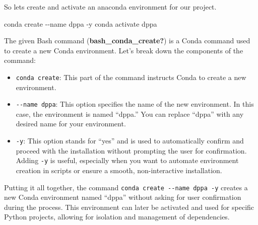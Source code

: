 \documentclass[
  letterpaper,
  DIV=11,
  numbers=noendperiod]{scrreprt}
\newenvironment{Shaded}{\begin{snugshade}}{\end{snugshade}}
\newcommand{\AttributeTok}[1]{\textcolor[rgb]{0.40,0.45,0.13}{#1}}
\newcommand{\ExtensionTok}[1]{\textcolor[rgb]{0.00,0.23,0.31}{#1}}
\newcommand{\NormalTok}[1]{\textcolor[rgb]{0.00,0.23,0.31}{#1}}
\begin{document}
So lets create and activate an anaconda environment for our project.

\begin{Shaded}
\begin{Highlighting}[]

\ExtensionTok{conda}\NormalTok{ create }\AttributeTok{{-}{-}name}\NormalTok{ dppa }\AttributeTok{{-}y}
\ExtensionTok{conda}\NormalTok{ activate dppa}
\end{Highlighting}
\end{Shaded}

\begin{tcolorbox}[enhanced jigsaw, bottomtitle=1mm, bottomrule=.15mm, colbacktitle=quarto-callout-note-color!10!white, breakable, titlerule=0mm, title=\textcolor{quarto-callout-note-color}{\faInfo}\hspace{0.5em}{Note}, left=2mm, colframe=quarto-callout-note-color-frame, arc=.35mm, toprule=.15mm, coltitle=black, colback=white, opacityback=0, toptitle=1mm, rightrule=.15mm, leftrule=.75mm, opacitybacktitle=0.6]

The given Bash command (\textbf{bash\_conda\_create?}) is a Conda
command used to create a new Conda environment. Let's break down the
components of the command:

\begin{itemize}
\item
  \texttt{conda\ create}: This part of the command instructs Conda to
  create a new environment.
\item
  \texttt{-\/-name\ dppa}: This option specifies the name of the new
  environment. In this case, the environment is named ``dppa.'' You can
  replace ``dppa'' with any desired name for your environment.
\item
  \texttt{-y}: This option stands for ``yes'' and is used to
  automatically confirm and proceed with the installation without
  prompting the user for confirmation. Adding \texttt{-y} is useful,
  especially when you want to automate environment creation in scripts
  or ensure a smooth, non-interactive installation.
\end{itemize}

Putting it all together, the command
\texttt{conda\ create\ -\/-name\ dppa\ -y} creates a new Conda
environment named ``dppa'' without asking for user confirmation during
the process. This environment can later be activated and used for
specific Python projects, allowing for isolation and management of
dependencies.

\end{tcolorbox}
\end{document}
